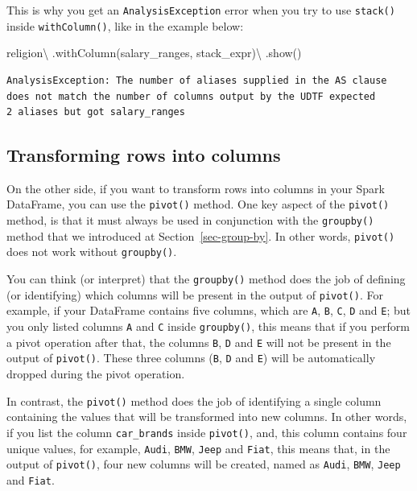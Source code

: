 \documentclass[
  11pt,
  letterpaper,
  DIV=11,
  numbers=noendperiod]{scrreprt}
\newenvironment{Shaded}{\begin{snugshade}}{\end{snugshade}}
\newcommand{\NormalTok}[1]{\textcolor[rgb]{0.00,0.23,0.31}{#1}}
\newcommand{\OperatorTok}[1]{\textcolor[rgb]{0.37,0.37,0.37}{#1}}
\newcommand{\StringTok}[1]{\textcolor[rgb]{0.13,0.47,0.30}{#1}}
\begin{document}
This is why you get an \texttt{AnalysisException} error when you try to
use \texttt{stack()} inside \texttt{withColumn()}, like in the example
below:

\begin{Shaded}
\begin{Highlighting}[]
\NormalTok{religion}\OperatorTok{\textbackslash{}}
\NormalTok{    .withColumn(}\StringTok{\textquotesingle{}salary\_ranges\textquotesingle{}}\NormalTok{, stack\_expr)}\OperatorTok{\textbackslash{}}
\NormalTok{    .show()}
\end{Highlighting}
\end{Shaded}

\begin{verbatim}
AnalysisException: The number of aliases supplied in the AS clause
does not match the number of columns output by the UDTF expected
2 aliases but got salary_ranges 
\end{verbatim}

\hypertarget{transforming-rows-into-columns}{%
\subsection{Transforming rows into
columns}\label{transforming-rows-into-columns}}

On the other side, if you want to transform rows into columns in your
Spark DataFrame, you can use the \texttt{pivot()} method. One key aspect
of the \texttt{pivot()} method, is that it must always be used in
conjunction with the \texttt{groupby()} method that we introduced at
Section~\ref{sec-group-by}. In other words, \texttt{pivot()} does not
work without \texttt{groupby()}.

You can think (or interpret) that the \texttt{groupby()} method does the
job of defining (or identifying) which columns will be present in the
output of \texttt{pivot()}. For example, if your DataFrame contains five
columns, which are \texttt{A}, \texttt{B}, \texttt{C}, \texttt{D} and
\texttt{E}; but you only listed columns \texttt{A} and \texttt{C} inside
\texttt{groupby()}, this means that if you perform a pivot operation
after that, the columns \texttt{B}, \texttt{D} and \texttt{E} will not
be present in the output of \texttt{pivot()}. These three columns
(\texttt{B}, \texttt{D} and \texttt{E}) will be automatically dropped
during the pivot operation.

In contrast, the \texttt{pivot()} method does the job of identifying a
single column containing the values that will be transformed into new
columns. In other words, if you list the column \texttt{car\_brands}
inside \texttt{pivot()}, and, this column contains four unique values,
for example, \texttt{Audi}, \texttt{BMW}, \texttt{Jeep} and
\texttt{Fiat}, this means that, in the output of \texttt{pivot()}, four
new columns will be created, named as \texttt{Audi}, \texttt{BMW},
\texttt{Jeep} and \texttt{Fiat}.
\end{document}
